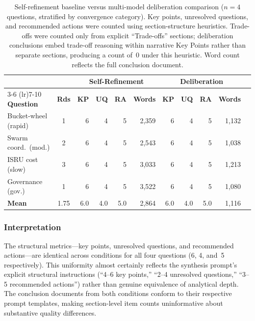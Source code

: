 \documentclass[11pt,a4paper]{article}
\begin{document}
\begin{table}[ht]
\centering
\caption{Self-refinement baseline versus multi-model deliberation comparison ($n = 4$ questions, stratified by convergence category). Key points, unresolved questions, and recommended actions were counted using section-structure heuristics. Trade-offs were counted only from explicit ``Trade-offs'' sections; deliberation conclusions embed trade-off reasoning within narrative Key Points rather than separate sections, producing a count of~0 under this heuristic. Word count reflects the full conclusion document.}
\label{tab:self_refinement}
\begin{tabular}{@{}p{2.8cm}crrrrrrrrr@{}}
\toprule
& & \multicolumn{4}{c}{\textbf{Self-Refinement}} & \multicolumn{4}{c}{\textbf{Deliberation}} \\
\cmidrule(lr){3-6} \cmidrule(lr){7-10}
\textbf{Question} & \textbf{Rds} & \textbf{KP} & \textbf{UQ} & \textbf{RA} & \textbf{Words} & \textbf{KP} & \textbf{UQ} & \textbf{RA} & \textbf{Words} \\
\midrule
Bucket-wheel (rapid) & 1 & 6 & 4 & 5 & 2{,}359 & 6 & 4 & 5 & 1{,}132 \\
Swarm coord.\ (mod.) & 2 & 6 & 4 & 5 & 2{,}543 & 6 & 4 & 5 & 1{,}038 \\
ISRU cost (slow) & 3 & 6 & 4 & 5 & 3{,}033 & 6 & 4 & 5 & 1{,}213 \\
Governance (gov.) & 1 & 6 & 4 & 5 & 3{,}522 & 6 & 4 & 5 & 1{,}080 \\
\midrule
\textbf{Mean} & 1.75 & 6.0 & 4.0 & 5.0 & 2{,}864 & 6.0 & 4.0 & 5.0 & 1{,}116 \\
\bottomrule
\end{tabular}
\end{table}

\subsubsection{Interpretation}

The structural metrics---key points, unresolved questions, and recommended actions---are identical across conditions for all four questions (6, 4, and~5 respectively). This uniformity almost certainly reflects the synthesis prompt's explicit structural instructions (``4--6 key points,'' ``2--4 unresolved questions,'' ``3--5 recommended actions'') rather than genuine equivalence of analytical depth. The conclusion documents from both conditions conform to their respective prompt templates, making section-level item counts uninformative about substantive quality differences.
\end{document}
